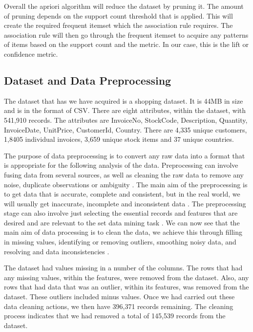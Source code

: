 \documentclass[a4paper,10pt]{article}
\begin{document}
Overall the apriori algorithm will reduce the dataset by pruning it. The amount of pruning depends on the support count threshold that is applied. This will create the required frequent itemset which the association rule requires. The association rule will then go through the frequent itemset to acquire any patterns of items based on the support count and the metric. In our case, this is the lift or confidence metric.

\subsection{Dataset and Data Preprocessing}

The dataset that has we have acquired is a shopping dataset. It is 44MB in size and is in the format of CSV. There are eight attributes, within the dataset, with 541,910 records. The attributes are InvoiceNo, StockCode, Description, Quantity, InvoiceDate, UnitPrice, CustomerId, Country. There are 4,335 unique customers, 1,8405 individual invoices, 3,659 unique stock items and 37 unique countries.

The purpose of data preprocessing is to convert any raw data into a format that is appropriate for the following analysis of the data. Preprocessing can involve fusing data from several sources, as well as cleaning the raw data to remove any noise, duplicate observations or ambiguity \cite{tan2016introduction}. The main aim of the preprocessing is to get data that is accurate, complete and consistent, but in the real world, we will usually get inaccurate, incomplete and inconsistent data \cite{han2011data}. The preprocessing stage can also involve just selecting the essential records and features that are desired and are relevant to the set data mining task \cite{tan2016introduction}. We can now see that the main aim of data processing is to clean the data, we achieve this through filling in missing values, identifying or removing outliers, smoothing noisy data, and resolving and data inconsistencies \cite{han2011data}.

The dataset had values missing in a number of the columns. The rows that had any missing values, within the features, were removed from the dataset. Also, any rows that had data that was an outlier, within its features, was removed from the dataset. These outliers included minus values. Once we had carried out these data cleaning actions, we then have 396,371 records remaining. The cleaning process indicates that we had removed a total of 145,539 records from the dataset. 
\end{document}
